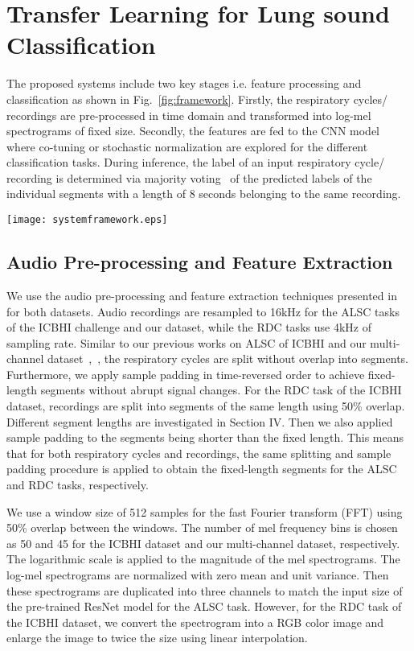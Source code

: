 \documentclass[journal]{IEEEtran}
\begin{document}
\section{Transfer Learning for Lung sound Classification}
The proposed systems include two key stages i.e. feature processing and classification as shown in Fig.~\ref{fig:framework}. Firstly, the respiratory cycles/ recordings are pre-processed in time domain and transformed into log-mel spectrograms of fixed size. Secondly, the features are fed to the CNN model where co-tuning or stochastic normalization are explored for the different classification tasks. During inference, the label of an input respiratory cycle/ recording is determined via majority voting~\cite{feldman1989majority} of the predicted labels of the individual segments with a length of 8 seconds belonging to the same recording. 
\begin{figure*}[t]
	\centering
    \texttt{[image: systemframework.eps]}
	\caption{Proposed transferred knowledge systems using co-tuning for transfer learning or stochastic normalization.}
	\label{fig:framework}
\end{figure*}


\subsection{Audio Pre-processing and Feature Extraction}
We use the audio pre-processing and feature extraction techniques presented in~\cite{nguyen2020lung} for both datasets. Audio recordings are resampled to 16kHz for the ALSC tasks of the ICBHI challenge and our dataset, while the RDC tasks use 4kHz of sampling rate. Similar to our previous works on ALSC of ICBHI and our multi-channel dataset~\cite{nguyen2020lung},~\cite{nguyen2021crackle}, the respiratory cycles are split without overlap into segments. Furthermore, we apply sample padding in time-reversed order to achieve fixed-length segments without abrupt signal changes. For the RDC task of the ICBHI dataset, recordings are split into segments of the same length using 50\% overlap. Different segment lengths are investigated in Section IV. Then we also applied sample padding to the segments being shorter than the fixed length. This means that for both respiratory cycles and recordings, the same splitting and sample padding procedure is applied to obtain the fixed-length segments for the ALSC and RDC tasks, respectively.

We use a window size of 512 samples for the fast Fourier transform (FFT) using 50\% overlap between the windows. The number of mel frequency bins is chosen as 50 and 45 for the ICBHI dataset and our multi-channel dataset, respectively. The logarithmic scale is applied to the magnitude of the mel spectrograms. The log-mel spectrograms are normalized with zero mean and unit variance. Then these spectrograms are duplicated into three channels to match the input size of the pre-trained ResNet model for the ALSC task. However, for the RDC task of the ICBHI dataset, we convert the spectrogram into a RGB color image and enlarge the image to twice the size using linear interpolation.   
\end{document}
